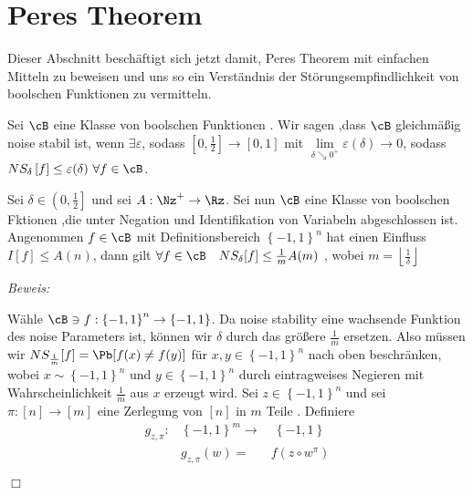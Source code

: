 \documentclass{article}
\newenvironment{proof}{
	\textit{Beweis: \\}
}{
	\begin{flushright}
		$\Box$ 
	\end{flushright}
}
\begin{document}
	 \section{Peres Theorem}
	 Dieser Abschnitt besch\"aftigt sich jetzt damit, Peres Theorem mit einfachen Mitteln zu beweisen und uns so ein Verst\"andnis der St\"orungsempfindlichkeit von boolschen Funktionen zu vermitteln.
	 \begin{defn}
		 Sei $\cB$ eine Klasse von boolschen Funktionen . Wir sagen ,dass $ \cB $ gleichm\"a{\ss}ig noise stabil ist, wenn $ \exists \varepsilon$, sodass $ \left[0,\frac{1}{2}\right] \to \left[0,1\right]$ mit $ \lim\limits_{\delta \searrow 0^+}\varepsilon(\delta) \to 0$, sodass $NS_\delta \left[ f \right]  \le \varepsilon(\delta) \ \forall f \in \cB $.
	 \end{defn}
	 \begin{thm}
		 Sei $\delta \in \left( 0, \frac{1}{2} \right] $ und sei $A: \Nz^+ \to \Rz $. Sei nun $\cB$ eine Klasse von boolschen Fktionen ,die unter Negation und Identifikation von Variabeln abgeschlossen ist. Angenommen $f \in \cB$ mit Definitionsbereich $ \left\lbrace -1,1 \right\rbrace^n $ hat einen Einfluss $ I[f] \le A(n)$, dann gilt $\forall f \in \cB \quad NS_\delta[f] \le \frac{1}{m} A(m)$ , wobei $ m = \left\lfloor \frac{1}{\delta} \right\rfloor$

	 \begin{proof}
			 W\"ahle $ \cB \ni f: \left\lbrace -1 ,1 \right\rbrace^n \to \left\lbrace -1, 1 \right\rbrace$. Da noise stability eine wachsende Funktion des noise Parameters ist, k\"onnen wir $ \delta $ durch das gr\"o{\ss}ere $ \frac{1}{m} $ ersetzen. Also m\"ussen wir $NS_{\frac{1}{m}}[f]=\Pb[f(x) \neq f(y) ]$ f\"ur $x,y \in \left\lbrace -1,1 \right\rbrace^n$ nach oben beschr\"anken, wobei $x \sim \left\lbrace -1 ,1 \right\rbrace^n$ und $y \in \left\lbrace -1, 1 \right\rbrace^n$  durch eintragweises Negieren mit Wahrscheinlichkeit $\frac{1}{m}$ aus $x$ erzeugt wird.
		 Sei $z \in \left\lbrace -1 ,1 \right\rbrace^n $ und  sei $ \pi: \left[ n \right] \to \left[ m \right] $ eine Zerlegung von $[n]$ in $m$ Teile . Definiere 
		 \begin{eqnarray*}
			 g_{z,\pi }:&\left\lbrace -1,1 \right\rbrace^m \to & \ \left\lbrace -1,1 \right\rbrace \\
			 & g_{z,\pi }\left(w\right)=& f( z \circ w^\pi )
		\end{eqnarray*}


\end{proof}
\end{thm}
\end{document}
